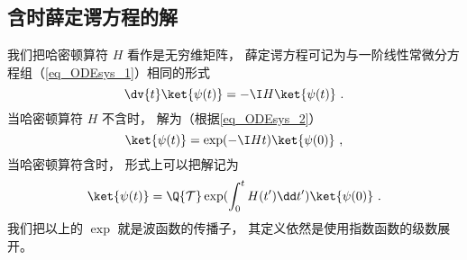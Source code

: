 \subsection{含时薛定谔方程的解}

我们把哈密顿算符 $H$ 看作是无穷维矩阵， 薛定谔方程可记为与一阶线性常微分方程组（\autoref{eq_ODEsys_1}）相同的形式
\begin{equation}
\dv{t} \ket{\psi(t)} = -\I H \ket{\psi(t)}~.
\end{equation}
当哈密顿算符 $H$ 不含时， 解为（根据\autoref{eq_ODEsys_2}）
\begin{equation}
\ket{\psi(t)} = \exp(-\I H t) \ket{\psi(0)}~,
\end{equation}
当哈密顿算符含时， 形式上可以把解记为
\begin{equation}
\ket{\psi(t)} = \Q {\mathcal T} \exp(\int_0^ t H(t')\dd t') \ket{\psi(0)}~.
\end{equation}
我们把以上的 $\exp$ 就是波函数的传播子， 其定义依然是使用指数函数的级数展开。
